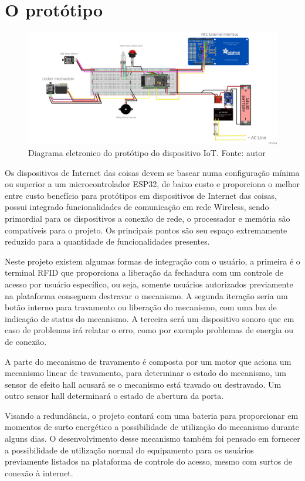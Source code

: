 
\chapter{\textbf{O protótipo}} %



\begin{figure}[h!]
	\includegraphics[width=\linewidth]{topics/sketch_bb.png}
	\caption{Diagrama eletronico do protótipo do dispositivo IoT. Fonte: autor}
	\label{fig:dataperformgraph}
\end{figure}

Os dispositivos de Internet das coisas devem se basear numa configuração mínima  ou superior a um microcontrolador ESP32, de baixo custo e proporciona o melhor entre custo benefício para protótipos em dispositivos de Internet das coisas, possui integrado funcionalidades de comunicação em rede Wireless, sendo primordial para os dispositivos a conexão de rede, o processador e memória são compatíveis para o projeto. Os principais pontos são seu espaço extremamente reduzido para a quantidade de funcionalidades presentes.\par
Neste projeto existem algumas formas de integração com o usuário, a primeira é o terminal RFID que proporciona a liberação da fechadura com um controle de acesso por usuário específico, ou seja, somente usuários autorizados previamente na plataforma conseguem destravar o mecanismo. A segunda iteração seria um botão interno para travamento ou liberação do mecanismo, com uma luz de indicação de status do mecanismo. A terceira será um dispositivo sonoro que em caso de problemas irá relatar o erro, como por exemplo problemas de energia ou de conexão.\par
A parte do mecanismo de travamento é composta por um motor que aciona um mecanismo linear de travamento, para determinar o estado do mecanismo, um sensor de efeito hall acusará se o mecanismo está travado ou destravado. Um outro sensor hall determinará o estado de abertura da porta.\par
Visando a redundância, o projeto contará com uma bateria para proporcionar em momentos de surto energético a possibilidade de utilização do mecanismo durante alguns dias. O desenvolvimento desse mecanismo também foi pensado em fornecer a possibilidade de utilização normal do equipamento para os usuários previamente listados na plataforma de controle do acesso, mesmo com surtos de conexão à internet.

